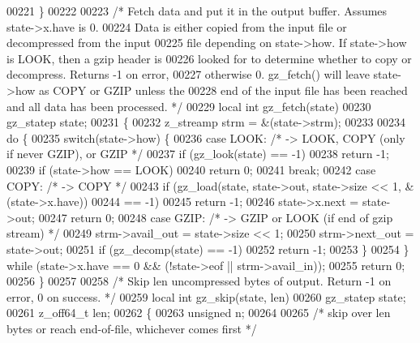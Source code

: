 \begin{DoxyCode}
00221 \}
00222 
00223 \textcolor{comment}{/* Fetch data and put it in the output buffer.  Assumes state->x.have is 0.}
00224 \textcolor{comment}{   Data is either copied from the input file or decompressed from the input}
00225 \textcolor{comment}{   file depending on state->how.  If state->how is LOOK, then a gzip header is}
00226 \textcolor{comment}{   looked for to determine whether to copy or decompress.  Returns -1 on error,}
00227 \textcolor{comment}{   otherwise 0.  gz\_fetch() will leave state->how as COPY or GZIP unless the}
00228 \textcolor{comment}{   end of the input file has been reached and all data has been processed.  */}
00229 local \textcolor{keywordtype}{int} gz\_fetch(state)
00230     gz\_statep state;
00231 \{
00232     z\_streamp strm = &(state->strm);
00233 
00234     \textcolor{keywordflow}{do} \{
00235         \textcolor{keywordflow}{switch}(state->how) \{
00236         \textcolor{keywordflow}{case} LOOK:      \textcolor{comment}{/* -> LOOK, COPY (only if never GZIP), or GZIP */}
00237             \textcolor{keywordflow}{if} (gz\_look(state) == -1)
00238                 \textcolor{keywordflow}{return} -1;
00239             \textcolor{keywordflow}{if} (state->how == LOOK)
00240                 \textcolor{keywordflow}{return} 0;
00241             \textcolor{keywordflow}{break};
00242         \textcolor{keywordflow}{case} COPY:      \textcolor{comment}{/* -> COPY */}
00243             \textcolor{keywordflow}{if} (gz\_load(state, state->out, state->size << 1, &(state->x.have))
00244                     == -1)
00245                 \textcolor{keywordflow}{return} -1;
00246             state->x.next = state->out;
00247             \textcolor{keywordflow}{return} 0;
00248         \textcolor{keywordflow}{case} GZIP:      \textcolor{comment}{/* -> GZIP or LOOK (if end of gzip stream) */}
00249             strm->avail\_out = state->size << 1;
00250             strm->next\_out = state->out;
00251             \textcolor{keywordflow}{if} (gz\_decomp(state) == -1)
00252                 \textcolor{keywordflow}{return} -1;
00253         \}
00254     \} \textcolor{keywordflow}{while} (state->x.have == 0 && (!state->eof || strm->avail\_in));
00255     \textcolor{keywordflow}{return} 0;
00256 \}
00257 
00258 \textcolor{comment}{/* Skip len uncompressed bytes of output.  Return -1 on error, 0 on success. */}
00259 local \textcolor{keywordtype}{int} gz\_skip(state, len)
00260     gz\_statep state;
00261     z\_off64\_t len;
00262 \{
00263     \textcolor{keywordtype}{unsigned} n;
00264 
00265     \textcolor{comment}{/* skip over len bytes or reach end-of-file, whichever comes first */}

\end{DoxyCode}
